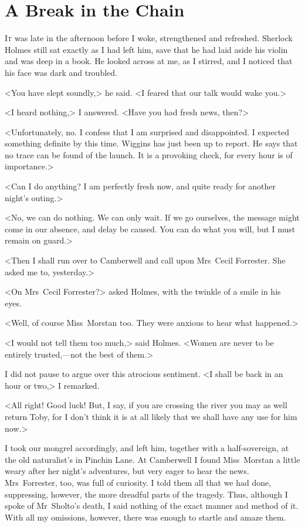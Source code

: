 \chapter{A Break in the Chain}
\lettrine{I}{t} was late in the afternoon before I woke, strengthened and refreshed. Sherlock Holmes still sat exactly as I had left him, save that he had laid aside his violin and was deep in a book. He looked across at me, as I stirred, and I noticed that his face was dark and troubled.

<You have slept soundly,> he said. <I feared that our talk would wake you.>

<I heard nothing,> I answered. <Have you had fresh news, then?>

<Unfortunately, no. I confess that I am surprised and disappointed. I expected something definite by this time. Wiggins has just been up to report. He says that no trace can be found of the launch. It is a provoking check, for every hour is of importance.>

<Can I do anything? I am perfectly fresh now, and quite ready for another night's outing.>

<No, we can do nothing. We can only wait. If we go ourselves, the message might come in our absence, and delay be caused. You can do what you will, but I must remain on guard.>

<Then I shall run over to Camberwell and call upon Mrs~Cecil Forrester. She asked me to, yesterday.>

<On Mrs~Cecil Forrester?> asked Holmes, with the twinkle of a smile in his eyes.

<Well, of course Miss~Morstan too. They were anxious to hear what happened.>

<I would not tell them too much,> said Holmes. <Women are never to be entirely trusted,—not the best of them.>

I did not pause to argue over this atrocious sentiment. <I shall be back in an hour or two,> I remarked.

<All right! Good luck! But, I say, if you are crossing the river you may as well return Toby, for I don't think it is at all likely that we shall have any use for him now.>

I took our mongrel accordingly, and left him, together with a half-sovereign, at the old naturalist's in Pinchin Lane. At Camberwell I found Miss~Morstan a little weary after her night's adventures, but very eager to hear the news. Mrs~Forrester, too, was full of curiosity. I told them all that we had done, suppressing, however, the more dreadful parts of the tragedy. Thus, although I spoke of Mr~Sholto's death, I said nothing of the exact manner and method of it. With all my omissions, however, there was enough to startle and amaze them.

